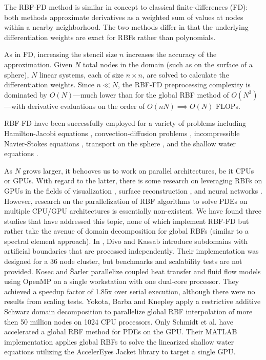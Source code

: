 The RBF-FD method is similar in concept to classical 
finite-differences (FD): both methods approximate derivatives as a weighted sum of values at nodes within a nearby neighborhood. The two methods differ in that the underlying differentiation 
weights are exact for RBFs rather than polynomials. 

As in FD, increasing the stencil size $n$  increases the accuracy of the approximation.
Given $N$ total nodes in the domain (such as on the surface of a sphere), $N$ linear systems, each of size $n \times n$, are solved to calculate the differentiation weights. Since $n \ll N$, the RBF-FD preprocessing complexity is dominated by $O(N)$---much lower than for the global RBF method of $O(N^3)$---with derivative evaluations on the order of $O(nN) \implies O(N)$ FLOPs. 

RBF-FD have been successfully employed for a variety of problems including Hamilton-Jacobi equations \cite{Cecil2004}, convection-diffusion problems \cite{Chandhini2007, Stevens2009b},
incompressible Navier-Stokes equations \cite{Shu2003,Chinchapatnam2009}, transport on the sphere \cite{FornbergLehto11}, and the shallow water equations \cite{FlyerLehto11}.

As $N$ grows larger, it behooves us to work on parallel architectures, be it CPUs or GPUs. With regard to the latter, there is some research on leveraging RBFs on GPUs in the fields of visualization \cite{Cuntz2007,Weiler2005},  surface reconstruction \cite{Corrigan2005,Carr2003}, and neural networks \cite{Brandstetter2008}. However, research on the parallelization of RBF algorithms to solve PDEs on multiple CPU/GPU architectures is essentially non-existent. We have found three studies that have addressed this topic, none of which implement RBF-FD but rather take the avenue of domain decomposition for global RBFs (similar to a spectral element approach). In \cite{Divo2007}, Divo and Kassab introduce subdomains with artificial boundaries that are processed independently. Their implementation was designed for a 36 node cluster, but benchmarks and scalability tests are not provided. Kosec and \v{S}arler \cite{Kosec2008} parallelize coupled heat transfer and fluid flow models using OpenMP on a single workstation with one dual-core processor. They achieved a speedup factor of 1.85x over serial execution, although there were
no results from scaling tests. Yokota, Barba and Knepley \cite{Yokota2010} apply a restrictive additive Schwarz domain decomposition to parallelize global RBF interpolation of more then 50 million nodes on 1024 CPU processors. Only Schmidt et al. \cite{Schmidt2009b} have accelerated a global RBF method for PDEs on the GPU. Their MATLAB implementation applies global RBFs to solve the linearized shallow water equations utilizing the AccelerEyes Jacket \cite{JacketGuide2009} library to target a single GPU.

